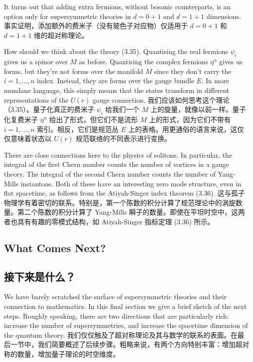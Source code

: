 \documentclass{ctexart}
\begin{document}
\begin{paracol}{2}
It turns out that adding extra fermions, without bosonic counterparts, is an option only for supersymmetric theories in $d = 0 + 1$ and $d = 1 + 1$ dimensions.
\switchcolumn
事实证明，添加额外的费米子（没有玻色子对应物）仅适用于 $d = 0 + 1$ 和 $d = 1 + 1$ 维的超对称理论。
\switchcolumn*

How should we think about the theory (3.35). Quantising the real fermions $\psi_i$ gives us a spinor over $M$ as before. Quantising the complex fermions $η^{\alpha}$ gives us forms, but they’re not forms over the manifold $M$ since they don’t carry the $i = 1, \dots, n$ index. Instead, they are forms over the gauge bundle $E$. In more mundane language, this simply means that the states transform in different representations of the $U(r)$ gauge connection.
\switchcolumn
我们应该如何思考这个理论（3.35）。量子化真正的费米子 $\psi_i$ 给我们一个 $M$ 上的旋量，就像以前一样。量子化复费米子 $η^{\alpha}$ 给出了形式，但它们不是流形 $M$ 上的形式，因为它们不带有 $i = 1, \dots, n$ 索引。相反，它们是规范丛 $E$ 上的表格。用更通俗的语言来说，这仅仅意味着状态以 $U(r)$ 规范联络的不同表示进行变换。
\switchcolumn*

There are close connections here to the physics of solitons. In particular, the integral of the first Chern number counts the number of vortices in a gauge theory. The integral of the second Chern number counts the number of Yang-Mills instantons. Both of these have an interesting zero mode structure, even in flat spacetime, as follows from the Atiyah-Singer index theorem (3.36).
\switchcolumn
这与孤子物理学有着密切的联系。特别是，第一个陈数的积分计算了规范理论中的涡旋数量。第二个陈数的积分计算了 Yang-Mills 瞬子的数量。即使在平坦时空中，这两者也具有有趣的零模式结构，如 Atiyah-Singer 指标定理 (3.36) 所示。
\switchcolumn*

\subsection{What Comes Next?}
\switchcolumn
\subsection*{接下来是什么？}
\switchcolumn*

We have barely scratched the surface of supersymmetric theories and their connection to mathematics. In this final section we give a brief sketch of the next steps. Roughly speaking, there are two directions that are particularly rich: increase the number of supersymmetries, and increase the spacetime dimension of the quantum theory.
\switchcolumn
我们仅仅触及了超对称理论及其与数学的联系的表面。在最后一节中，我们简要概述了后续步骤。粗略来说，有两个方向特别丰富：增加超对称的数量，增加量子理论的时空维度。
\switchcolumn*


\end{paracol}
\end{document}
